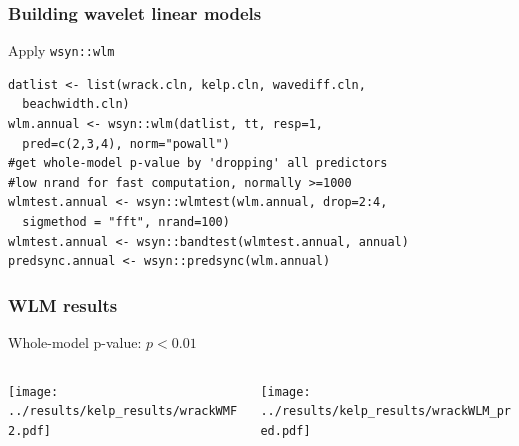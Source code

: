 \documentclass{beamer}
\begin{document}
\begin{frame}[fragile]
\frametitle{Building wavelet linear models}
\begin{exampleblock}{Apply \texttt{wsyn::wlm}}
\begin{verbatim}
datlist <- list(wrack.cln, kelp.cln, wavediff.cln, 
  beachwidth.cln)
wlm.annual <- wsyn::wlm(datlist, tt, resp=1, 
  pred=c(2,3,4), norm="powall")
#get whole-model p-value by 'dropping' all predictors
#low nrand for fast computation, normally >=1000
wlmtest.annual <- wsyn::wlmtest(wlm.annual, drop=2:4, 
  sigmethod = "fft", nrand=100)
wlmtest.annual <- wsyn::bandtest(wlmtest.annual, annual)
predsync.annual <- wsyn::predsync(wlm.annual)
\end{verbatim}
\end{exampleblock}
\end{frame}

\begin{frame}
\frametitle{WLM results}
Whole-model p-value: $p < 0.01$
\begin{columns}[c]
\begin{column}{6cm}
\texttt{[image: ../results/kelp\_results/wrackWMF2.pdf]}
\end{column}
\begin{column}{6cm}
\texttt{[image: ../results/kelp\_results/wrackWLM\_pred.pdf]}
\end{column}
\end{columns}
\end{frame}
\end{document}
